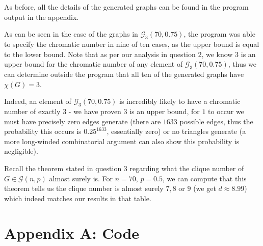 \documentclass{article}
\begin{document}
\begin{center}
\end{center}

As before, all the details of the generated graphs can be found in the program output in the appendix.

As can be seen in the case of the graphs in $\mathcal{G}_3(70,0.75)$, the program was able to specify the chromatic number in nine of ten cases, as the upper bound is equal to the lower bound. Note that as per our analysis in question 2, we know $3$ is an upper bound for the chromatic number of any element of $\mathcal{G}_3(70,0.75)$, thus we can determine outside the program that all ten of the generated graphs have $\chi(G) = 3$.

Indeed, an element of $\mathcal{G}_3(70,0.75)$ is incredibly likely to have a chromatic number of exactly $3$ - we have proven $3$ is an upper bound, for $1$ to occur we must have precisely zero edges generate (there are $1633$ possible edges, thus the probability this occurs is $0.25^{1633}$, essentially zero) or no triangles generate (a more long-winded combinatorial argument can also show this probability is negligible).

Recall the theorem stated in question 3 regarding what the clique number of $G \in \mathcal{G}(n,p)$ almost surely is. For $n=70$, $p=0.5$, we can compute that this theorem tells us the clique number is almost surely $7, 8$ or $9$ (we get $d \approx 8.99$) which indeed matches our results in that table.

\newpage

\newpage
				
\section{Appendix A: Code}
\label{appendix_a_code}
\end{document}
